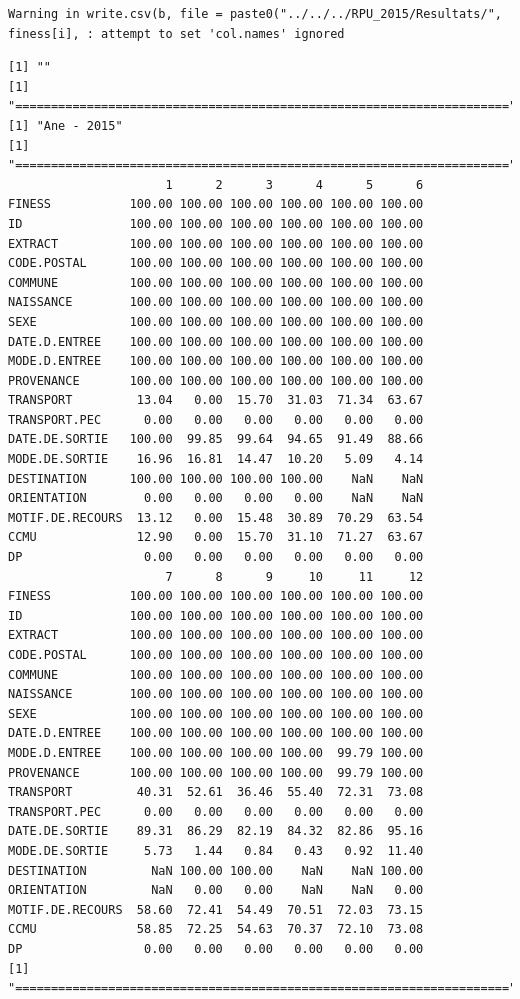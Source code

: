 \documentclass[]{article}
\begin{document}
\begin{verbatim}
Warning in write.csv(b, file = paste0("../../../RPU_2015/Resultats/",
finess[i], : attempt to set 'col.names' ignored
\end{verbatim}

\begin{verbatim}
[1] ""
[1] "====================================================================="
[1] "Ane - 2015"
[1] "====================================================================="
                      1      2      3      4      5      6
FINESS           100.00 100.00 100.00 100.00 100.00 100.00
ID               100.00 100.00 100.00 100.00 100.00 100.00
EXTRACT          100.00 100.00 100.00 100.00 100.00 100.00
CODE.POSTAL      100.00 100.00 100.00 100.00 100.00 100.00
COMMUNE          100.00 100.00 100.00 100.00 100.00 100.00
NAISSANCE        100.00 100.00 100.00 100.00 100.00 100.00
SEXE             100.00 100.00 100.00 100.00 100.00 100.00
DATE.D.ENTREE    100.00 100.00 100.00 100.00 100.00 100.00
MODE.D.ENTREE    100.00 100.00 100.00 100.00 100.00 100.00
PROVENANCE       100.00 100.00 100.00 100.00 100.00 100.00
TRANSPORT         13.04   0.00  15.70  31.03  71.34  63.67
TRANSPORT.PEC      0.00   0.00   0.00   0.00   0.00   0.00
DATE.DE.SORTIE   100.00  99.85  99.64  94.65  91.49  88.66
MODE.DE.SORTIE    16.96  16.81  14.47  10.20   5.09   4.14
DESTINATION      100.00 100.00 100.00 100.00    NaN    NaN
ORIENTATION        0.00   0.00   0.00   0.00    NaN    NaN
MOTIF.DE.RECOURS  13.12   0.00  15.48  30.89  70.29  63.54
CCMU              12.90   0.00  15.70  31.10  71.27  63.67
DP                 0.00   0.00   0.00   0.00   0.00   0.00
                      7      8      9     10     11     12
FINESS           100.00 100.00 100.00 100.00 100.00 100.00
ID               100.00 100.00 100.00 100.00 100.00 100.00
EXTRACT          100.00 100.00 100.00 100.00 100.00 100.00
CODE.POSTAL      100.00 100.00 100.00 100.00 100.00 100.00
COMMUNE          100.00 100.00 100.00 100.00 100.00 100.00
NAISSANCE        100.00 100.00 100.00 100.00 100.00 100.00
SEXE             100.00 100.00 100.00 100.00 100.00 100.00
DATE.D.ENTREE    100.00 100.00 100.00 100.00 100.00 100.00
MODE.D.ENTREE    100.00 100.00 100.00 100.00  99.79 100.00
PROVENANCE       100.00 100.00 100.00 100.00  99.79 100.00
TRANSPORT         40.31  52.61  36.46  55.40  72.31  73.08
TRANSPORT.PEC      0.00   0.00   0.00   0.00   0.00   0.00
DATE.DE.SORTIE    89.31  86.29  82.19  84.32  82.86  95.16
MODE.DE.SORTIE     5.73   1.44   0.84   0.43   0.92  11.40
DESTINATION         NaN 100.00 100.00    NaN    NaN 100.00
ORIENTATION         NaN   0.00   0.00    NaN    NaN   0.00
MOTIF.DE.RECOURS  58.60  72.41  54.49  70.51  72.03  73.15
CCMU              58.85  72.25  54.63  70.37  72.10  73.08
DP                 0.00   0.00   0.00   0.00   0.00   0.00
[1] "====================================================================="
\end{verbatim}
\end{document}
